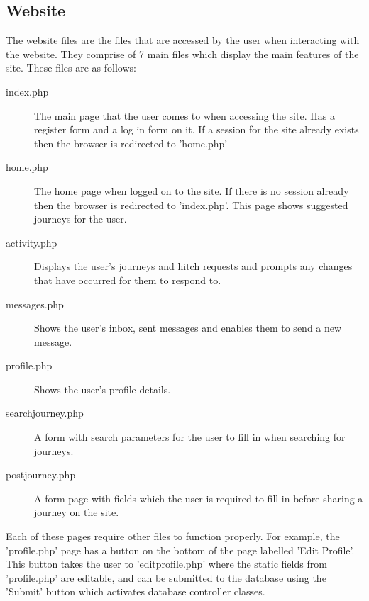 \documentclass[11pt]{article}
\begin{document}
\subsection{Website}

The website files are the files that are accessed by the user when interacting with the website. They comprise of 7 main files which display the main features of the site. These files are as follows:

\begin{description}
\item[index.php] The main page that the user comes to when accessing the site. Has a register form and a log in form on it.
If a session for the site already exists then the browser is redirected to 'home.php'
\item[home.php] The home page when logged on to the site. If there is no session already then the browser is redirected to 'index.php'. This page shows suggested journeys for the user.
\item[activity.php] Displays the user's journeys and hitch requests and prompts any changes that have occurred for them to respond to.
\item[messages.php] Shows the user's inbox, sent messages and enables them to send a new message.
\item[profile.php] Shows the user's profile details. 
\item[search\textunderscore journey.php] A form with search parameters for the user to fill in when searching for journeys.
\item[post\textunderscore journey.php] A form page with fields which the user is required to fill in before sharing a journey on the site.
\end{description}

Each of these pages require other files to function properly. For example, the 'profile.php' page has a button on the bottom of the page labelled 'Edit Profile'. This button takes the user to 'edit\textunderscore profile.php' where the static fields from 'profile.php' are editable, and can be submitted to the database using the 'Submit' button which activates database controller classes.
\end{document}
